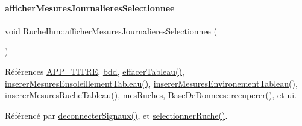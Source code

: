 \paragraph{\texorpdfstring{afficher\+Mesures\+Journalieres\+Selectionnee}{afficherMesuresJournalieresSelectionnee}}
{\footnotesize\ttfamily void Ruche\+Ihm\+::afficher\+Mesures\+Journalieres\+Selectionnee (\begin{DoxyParamCaption}{ }\end{DoxyParamCaption})\hspace{0.3cm}{\ttfamily [slot]}}



Références \hyperlink{parametres_8h_ace364d1ce44aa9f79bcff6e3752c4a5f}{A\+P\+P\+\_\+\+T\+I\+T\+RE}, \hyperlink{class_ruche_ihm_a0851936fe212e8d40538264f09749153}{bdd}, \hyperlink{class_ruche_ihm_a386868ba4e6e37b9d877fe3ab330e605}{effacer\+Tableau()}, \hyperlink{class_ruche_ihm_a6830ca55859cc2899ae8eb51b112557b}{inserer\+Mesures\+Ensoleillement\+Tableau()}, \hyperlink{class_ruche_ihm_a7c292baed04f6240697afb6c6f894358}{inserer\+Mesures\+Environement\+Tableau()}, \hyperlink{class_ruche_ihm_afada4cd970c0e34c3fd62d63e5af7a88}{inserer\+Mesures\+Ruche\+Tableau()}, \hyperlink{class_ruche_ihm_ab7741fa67b19cbb2da7eb12c58cf83c1}{mes\+Ruches}, \hyperlink{class_base_de_donnees_a77539baad389f5acf754cd2cd452403e}{Base\+De\+Donnees\+::recuperer()}, et \hyperlink{class_ruche_ihm_a64786058bd7f88ca2f1e9743bb27c25b}{ui}.



Référencé par \hyperlink{class_ruche_ihm_a348a76106f3072dd31a382c6025b8113}{deconnecter\+Signaux()}, et \hyperlink{class_ruche_ihm_a7324ae6ea574ccdad47783f466933157}{selectionner\+Ruche()}.


